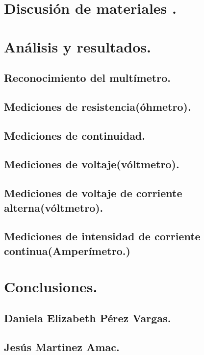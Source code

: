 \documentclass[10pt]{article}
\begin{document}
\begin{multicols}{2}
\section{Discusión de materiales .}


\section{Análisis y resultados.}

\subsection{Reconocimiento del multímetro.}

\subsection{Mediciones de resistencia(óhmetro).}

\subsection{Mediciones de continuidad.}

\subsection{Mediciones de voltaje(vóltmetro).}

\subsection{Mediciones de voltaje de corriente alterna(vóltmetro).}

\subsection{Mediciones de intensidad de corriente continua(Amperímetro.)}




\section{Conclusiones.}

\subsection*{Daniela Elizabeth Pérez Vargas.}

\subsection*{Jesús Martinez Amac.}

\end{multicols}
\end{document}
